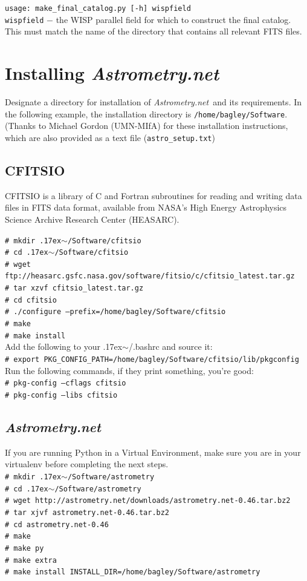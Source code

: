 \documentclass{article}
\newcommand{\ttsim}{\raise.17ex\hbox{$\scriptstyle\mathtt{\sim}$}}
\newcommand{\shellcmd}[1]{\indent\indent\texttt{\small\# #1}\\}
\newcommand{\An}{\textit{Astrometry.net}}
\begin{document}
\texttt{usage: make\_final\_catalog.py [-h] wispfield} \\

\texttt{wispfield} $-$ \hangindent=2.7cm the WISP parallel field for which
to construct the final catalog. This must match the name of the directory that
contains all relevant FITS files.\\

\vspace{4 mm}
\appendix
\section{Installing \An}
Designate a directory for installation of \An~and its requirements.
In the following example, the installation directory is
\texttt{/home/bagley/Software}. \\

\noindent (Thanks to Michael Gordon (UMN-MIfA) for these installation 
instructions, which are also provided as a text file (\texttt{astro\_setup.txt})

\subsection{CFITSIO}
CFITSIO is a library of C and Fortran subroutines for reading and writing
data files in FITS data format, available from NASA's High Energy
Astrophysics Science Archive Research Center (HEASARC). 

\shellcmd{mkdir \ttsim/Software/cfitsio}
\shellcmd{cd \ttsim/Software/cfitsio}
\shellcmd{wget ftp://heasarc.gsfc.nasa.gov/software/fitsio/c/cfitsio\_latest.tar.gz}
\shellcmd{tar xzvf cfitsio\_latest.tar.gz}
\shellcmd{cd cfitsio}
\shellcmd{./configure --prefix=/home/bagley/Software/cfitsio}
\shellcmd{make}
\shellcmd{make install}

\noindent Add the following to your \ttsim/.bashrc and source it: \\
\shellcmd{export PKG\_CONFIG\_PATH=/home/bagley/Software/cfitsio/lib/pkgconfig}

\noindent Run the following commands, if they print something, you're good: \\
\shellcmd{pkg-config --cflags cfitsio}
\shellcmd{pkg-config --libs cfitsio}

\subsection{\An}
If you are running Python in a Virtual Environment, make sure you are 
in your virtualenv before completing the next steps. \\
\shellcmd{mkdir \ttsim/Software/astrometry}
\shellcmd{cd \ttsim/Software/astrometry}
\shellcmd{wget http://astrometry.net/downloads/astrometry.net-0.46.tar.bz2}
\shellcmd{tar xjvf astrometry.net-0.46.tar.bz2}
\shellcmd{cd astrometry.net-0.46}
\shellcmd{make}
\shellcmd{make py}
\shellcmd{make extra}
\shellcmd{make install INSTALL\_DIR=/home/bagley/Software/astrometry}
\end{document}
